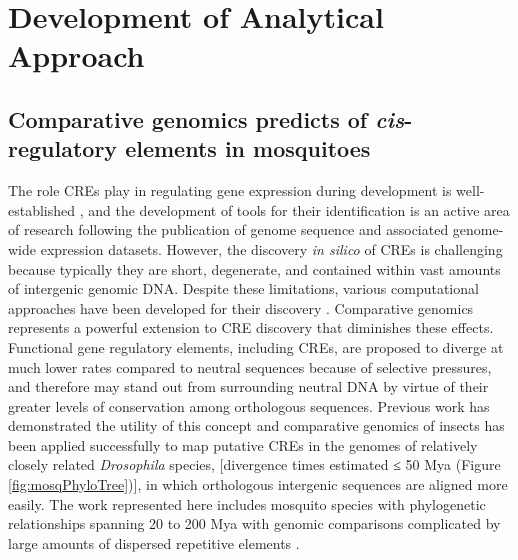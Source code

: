 \chapter{Development of Analytical Approach}

\section{Comparative genomics predicts of \textit{cis}-regulatory elements in mosquitoes \cite{Sieglaff2009}}






The role \glspl{CRE} play in regulating gene expression during development is well-established \cite{Davidson2010}, and the development of tools for their identification is an active area of research following the publication of genome sequence and associated genome-wide expression datasets. However, the discovery \textit{in silico} of \glspl{CRE} is challenging because typically they are short, degenerate, and contained within vast amounts of intergenic genomic DNA. Despite these limitations, various computational approaches have been developed for their discovery \cite{Das2007a,Hu2005,Tompa2005,Wasserman2004}. Comparative genomics represents a powerful extension to \gls{CRE} discovery that diminishes these effects. Functional gene regulatory elements, including \glspl{CRE}, are proposed to diverge at much lower rates compared to neutral sequences because of selective pressures, and therefore may stand out from surrounding neutral DNA by virtue of their greater levels of conservation among orthologous sequences. Previous work has demonstrated the utility of this concept \cite{Elemento2005,Stark2007,Xie2005} and comparative genomics of insects has been applied successfully to map putative \glspl{CRE} in the genomes of relatively closely related \textit{Drosophila} species, [divergence times estimated ≤ 50 \gls{Mya} \cite{Stark2007} (Figure \ref{fig:mosqPhyloTree})], in which orthologous intergenic sequences are aligned more easily. The work represented here includes mosquito species with phylogenetic relationships spanning 20 to 200 \gls{Mya} with genomic comparisons complicated by large amounts of dispersed repetitive elements \cite{Nene2007}.

